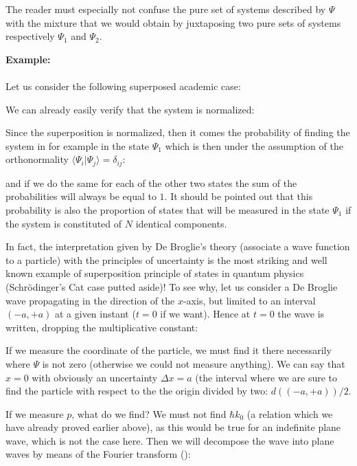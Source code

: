 	\begin{tcolorbox}[title=Remark,colframe=black,arc=10pt]
	The reader must especially not confuse the pure set of systems described by $\Psi$ with the mixture that we would obtain by juxtaposing two pure sets of systems respectively $\Psi_1$ and $\Psi_2$.
	\end{tcolorbox}
	
	\begin{tcolorbox}[colframe=black,colback=white,sharp corners]
	\textbf{{\Large {}}Example:}\\\\
	Let us consider the following superposed academic case:
	
	We can already easily verify that the system is normalized:
	
	Since the superposition is normalized, then it comes the probability of finding the system in for example in the state $\Psi_1$ which is then under the assumption of the orthonormality $\langle \Psi_i|\Psi_j \rangle=\delta_{ij}$:
	
	and if we do the same for each of the other two states the sum of the probabilities will always be equal to $1$. It should be pointed out that this probability is also the proportion of states that will be measured in the state $\Psi_1$ if the system is constituted of $N$ identical components.
	\end{tcolorbox}
	In fact, the interpretation given by De Broglie's theory (associate a wave function to a particle) with the principles of uncertainty is the most striking and well known example of superposition principle of states in quantum physics (Schrödinger's Cat case putted aside)! To see why, let us consider a De Broglie wave propagating in the direction of the $x$-axis, but limited to an interval $(-a,+a)$ at a given instant ($t=0$ if we want). Hence at $t=0$ the wave is written, dropping the multiplicative constant:
	
	If we measure the coordinate of the particle, we must find it there necessarily where $\Psi$ is not zero (otherwise we could not measure anything). We can say that $x=0$ with obviously an uncertainty $\Delta x=a$ (the interval where we are sure to find the particle with respect to the the origin divided by two: $d((-a,+a))/2$.
	
	If we measure $p$, what do we find? We must not find $\hbar k_0$ (a relation which we have already proved earlier above), as this would be true for an indefinite plane wave, which is not the case here. Then we will decompose the wave into plane waves by means of the Fourier transform ():
	
